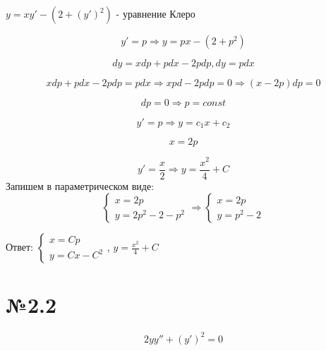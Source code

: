 \documentclass{article}
\begin{document}
$y = xy' - (2 + (y')^2)$ - уравнение Клеро

\begin{equation*}
    y' = p \Rightarrow  y = px - (2 + p^2)
\end{equation*}

\begin{equation*}
    dy = xdp + pdx - 2pdp,  dy = pdx
\end{equation*}

\begin{equation*}
    xdp +pdx - 2pdp = pdx \Rightarrow xpd - 2pdp = 0 \Rightarrow (x - 2p) dp = 0
\end{equation*}

\begin{equation*}
    dp = 0 \Rightarrow  p = const
\end{equation*}

\begin{equation*}
    y' = p \Rightarrow y = c_1x + c_2
\end{equation*}

\begin{equation*}
    x = 2p
\end{equation*}

\begin{equation*}
    y' = \frac{x}{2} \Rightarrow y = \frac{x^2}{4} + C
\end{equation*}
Запишем в параметрическом виде:
\begin{equation*}
    \begin{cases}
    x = 2p \\
    y = 2p^2 - 2 - p^2
    \end{cases}
    \Rightarrow
    \begin{cases}
    x = 2p \\
    y = p^2 - 2
    \end{cases}
\end{equation*}

Ответ: $\begin{cases}
    x = Cp \\
    y = Cx - C^2
    \end{cases}$,
    $y = \frac{x^2}{4} + C$

\section*{№2.2}
\begin{equation*}
    2yy'' + (y')^2 = 0
\end{equation*}
\end{document}
